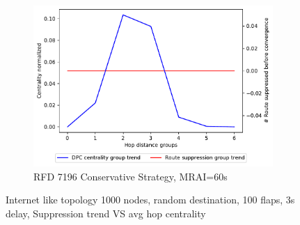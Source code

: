 \begin{figure}[H]
\begin{subfigure}[b]{0.325\textwidth}
         \includegraphics[width=\textwidth]{images/RFD/miceVSelephants/MultiMRAI/60/mice/cisco_1000_RFD_7196_conservative_nodeConvergence_centVSsup_trend.pdf}
         \caption{RFD 7196 Conservative Strategy, MRAI=60s}
         \label{fig:1000_7196RFDC_centVSsup_mices}
     \end{subfigure}
        \caption{Internet like topology 1000 nodes, random destination, 100 flaps, 3s delay, Suppression trend VS avg hop centrality}
        \label{fig:1000_RFD_centVSsup_mices}
\end{figure}

